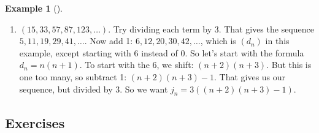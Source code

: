 \documentclass[10pt,]{book}
\theoremstyle{plain}
\theoremstyle{definition}
\theoremstyle{definition}
\newtheorem{example}[theorem]{Example}
\theoremstyle{definition}
\theoremstyle{definition}
\numberwithin{equation}{chapter}
\begin{document}
\begin{example}[]
\begin{enumerate}
\item\hypertarget{li-53}{}\hypertarget{p-81}{}%
\((15, 33, 57, 87, 123, \ldots)\). Try dividing each term by 3. That gives the sequence \(5, 11, 19, 29, 41,\ldots\). Now add 1: \(6, 12, 20, 30, 42, \ldots\), which is \((d_n)\) in this example, except starting with 6 instead of 0. So let's start with the formula \(d_n= n(n+1)\). To start with the 6, we shift: \((n+2)(n+3)\). But this is one too many, so subtract 1: \((n+2)(n+3) - 1\). That gives us our sequence, but divided by 3. So we want \(j_n = 3((n+2)(n+3) - 1)\).%
\end{enumerate}
%
\end{example}
\typeout{************************************************}
\typeout{************************************************}
\subsection[{Exercises}]{Exercises}\label{exercises_seq_basics}
\end{document}
